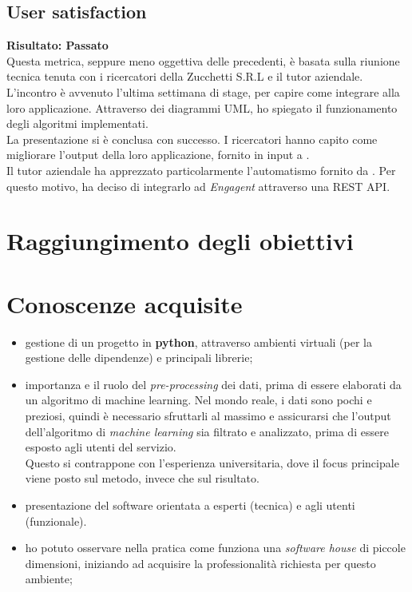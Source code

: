 \subsection{User satisfaction} %
\textbf{Risultato: Passato}\\
Questa metrica, seppure meno oggettiva delle precedenti, è basata sulla riunione tecnica tenuta con i ricercatori della Zucchetti S.R.L e il tutor aziendale.\\
L'incontro è avvenuto l'ultima settimana di stage, per capire come integrare {\app} alla loro applicazione. Attraverso dei diagrammi UML, ho spiegato il funzionamento degli algoritmi implementati.\\
La presentazione si è conclusa con successo. I ricercatori hanno capito come migliorare l'output della loro applicazione, fornito in input a {\app}.\\
Il tutor aziendale ha apprezzato particolarmente l'automatismo fornito da {\app}. Per questo motivo, ha deciso di integrarlo ad \textit{Engagent} attraverso una REST API.

\section{Raggiungimento degli obiettivi}

\section{Conoscenze acquisite}
\begin{itemize}
    \item gestione di un progetto in \textbf{python}, attraverso ambienti virtuali (per la gestione delle dipendenze) e principali librerie;
    \item importanza e il ruolo del \textit{pre-processing} dei dati, prima di essere elaborati da un algoritmo di machine learning. Nel mondo reale, i dati sono pochi e preziosi, quindi è necessario sfruttarli al massimo e assicurarsi che l'output dell'algoritmo di \textit{machine learning} sia filtrato e analizzato, prima di essere esposto agli utenti del servizio.\\ Questo si contrappone con l'esperienza universitaria, dove il focus principale viene posto sul metodo, invece che sul risultato.
    \item presentazione del software orientata a esperti (tecnica) e agli utenti (funzionale).
    \item ho potuto osservare nella pratica come funziona una \textit{software house} di piccole dimensioni, iniziando ad acquisire la professionalità richiesta per questo ambiente;
\end{itemize}
